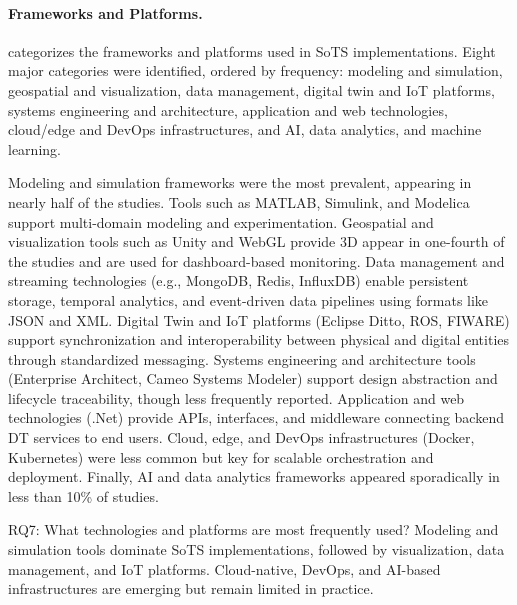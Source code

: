
\paragraph{Frameworks and Platforms.}
 categorizes the frameworks and platforms used in SoTS implementations. Eight major categories were identified, ordered by frequency: modeling and simulation, geospatial and visualization, data management, digital twin and IoT platforms, systems engineering and architecture, application and web technologies, cloud/edge and DevOps infrastructures, and AI, data analytics, and machine learning.

Modeling and simulation frameworks were the most prevalent, appearing in nearly half of the studies. Tools such as MATLAB, Simulink, and Modelica support multi-domain modeling and experimentation.
Geospatial and visualization tools such as Unity and WebGL provide 3D appear in one-fourth of the studies and are used for dashboard-based monitoring.
Data management and streaming technologies (e.g., MongoDB, Redis, InfluxDB) enable persistent storage, temporal analytics, and event-driven data pipelines using formats like JSON and XML.
Digital Twin and IoT platforms (Eclipse Ditto, ROS, FIWARE) support synchronization and interoperability between physical and digital entities through standardized messaging.
Systems engineering and architecture tools (Enterprise Architect, Cameo Systems Modeler) support design abstraction and lifecycle traceability, though less frequently reported.
Application and web technologies (.Net) provide APIs, interfaces, and middleware connecting backend DT services to end users.
Cloud, edge, and DevOps infrastructures (Docker, Kubernetes) were less common but key for scalable orchestration and deployment.
Finally, AI and data analytics frameworks appeared sporadically in less than 10\% of studies.

\vspace{1em}
\begin{conclusionframe}{RQ7: What technologies and platforms are most frequently used?}
Modeling and simulation tools dominate SoTS implementations, followed by visualization, data management, and IoT platforms. Cloud-native, DevOps, and AI-based infrastructures are emerging but remain limited in practice.\end{conclusionframe}
